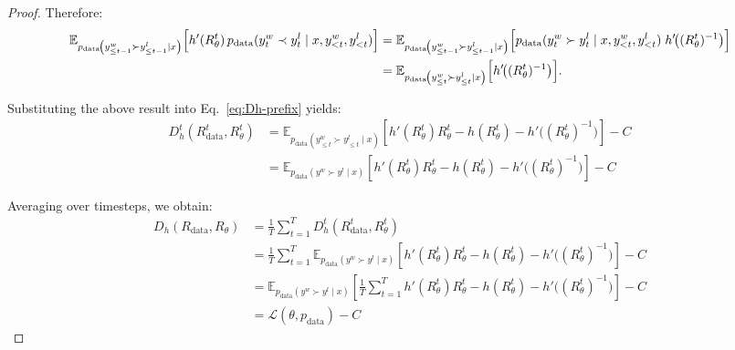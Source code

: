 \documentclass{article}
\theoremstyle{plain}
\theoremstyle{definition}
\theoremstyle{remark}
\begin{document}
\begin{proof}
Therefore:
\[
\begin{aligned}
\mathbb{E}_{p_{\text{data}}\!\left(y_{\leq t-1}^{w}\succ y_{\leq t-1}^{l}\mid x\right)}
\Bigl[
h'(R_\theta^t)\,p_\text{data}(y_{t}^{w}\prec y_{t}^{l}\mid x,y_{<t}^{w},y_{<t}^{l})
\Bigr]
&=
\mathbb{E}_{p_{\text{data}}\!\left(y_{\leq t-1}^{w}\succ y_{\leq t-1}^{l}\mid x\right)}
\Bigl[
p_\text{data}(y_{t}^{w}\succ y_{t}^{l}\mid x,y_{<t}^{w},y_{<t}^{l})\;
h'\!\bigl((R_\theta^t)^{-1}\bigr)
\Bigr] \\
&=
\mathbb{E}_{p_{\text{data}}\!\left(y_{\leq t}^{w}\succ y_{\leq t}^{l}\mid x\right)}
\Bigl[
h'\!\bigl((R_\theta^t)^{-1}\bigr)
\Bigr].
\end{aligned}
\]

Substituting the above result into Eq.~\eqref{eq:Dh-prefix} yields:
\[
\begin{aligned}
D_{h}^{t}\!\left(R_{\text{data}}^{t},R_{\theta}^{t}\right)
&= \mathbb{E}_{p_{\text{data}}\!\left(y_{\leq t}^{w}\succ y_{\leq t}^{l}\mid x\right)}\!\left[h'(R_\theta^t)R_\theta^t - h(R_\theta^t)-h'\!\bigl((R_\theta^t)^{-1}\bigr)\right] - C \\
&= \mathbb{E}_{p_{\text{data}}\!\left(y^{w}\succ y^{l}\mid x\right)}\!\left[h'(R_\theta^t)R_\theta^t - h(R_\theta^t)-h'\!\bigl((R_\theta^t)^{-1}\bigr)\right] - C
\end{aligned}
\]

Averaging over timesteps, we obtain:
\begin{align*}
D_{h}\left(R_{\text{data}},R_{\theta}\right)
&= \frac{1}{T}\sum_{t=1}^{T}D_{h}^{t}\left(R_{\text{data}}^{t},R_{\theta}^{t}\right) \\
&= \frac{1}{T}\sum_{t=1}^{T} \mathbb{E}_{p_{\text{data}}\!\left(y^{w}\succ y^{l}\mid x\right)}\!\left[h'(R_\theta^t)R_\theta^t - h(R_\theta^t)-h'\!\bigl((R_\theta^t)^{-1}\bigr)\right] - C \\
&= \mathbb{E}_{p_{\text{data}}\!\left(y^{w}\succ y^{l}\mid x\right)}\!\left[\frac{1}{T}\sum_{t=1}^{T}h'(R_\theta^t)R_\theta^t - h(R_\theta^t)-h'\!\bigl((R_\theta^t)^{-1}\bigr)\right] - C \\
&= \mathcal{L}\!\left(\theta,p_{\text{data}}\right) -C
\end{align*}

\end{proof}
\end{document}
